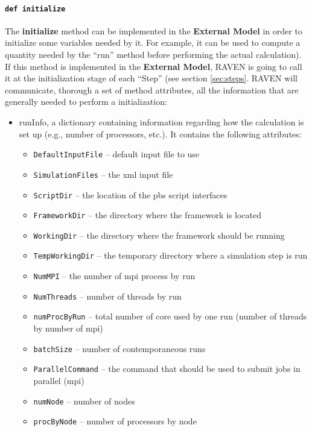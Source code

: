 \paragraph{\texttt{def initialize}}
\label{subsubsubsec:externalInitialize}
The \textbf{initialize} method can be implemented in the \textbf{External Model}
in order to initialize some variables needed by it.
%
For example, it can be used to compute a quantity needed by the ``run'' method
before performing the actual calculation).
%
If this method is implemented in the \textbf{External Model}, RAVEN is going to
call it at the initialization stage of each ``Step'' (see section
\ref{sec:steps}.
%
RAVEN will communicate, thorough a set of method attributes, all the information
that are generally needed to perform a initialization:
\begin{itemize}
  \item runInfo, a dictionary containing information regarding how the
  calculation is set up (e.g., number of processors, etc.).
  It contains the following attributes:
  \begin{itemize}
    \item \texttt{DefaultInputFile} -- default input file to use
    \item \texttt{SimulationFiles} -- the xml input file
    \item \texttt{ScriptDir} -- the location of the pbs script interfaces
    \item \texttt{FrameworkDir} -- the directory where the framework is located
    \item \texttt{WorkingDir} -- the directory where the framework should be
    running
    \item \texttt{TempWorkingDir} -- the temporary directory where a simulation
    step is run
    \item \texttt{NumMPI} -- the number of mpi process by run
    \item \texttt{NumThreads} -- number of threads by run
    \item \texttt{numProcByRun} -- total number of core used by one run (number
    of threads by number of mpi)
    \item \texttt{batchSize} -- number of contemporaneous runs
    \item \texttt{ParallelCommand} -- the command that should be used to submit
    jobs in parallel (mpi)
    \item \texttt{numNode} -- number of nodes
    \item \texttt{procByNode} -- number of processors by node

\end{itemize}
\end{itemize}
